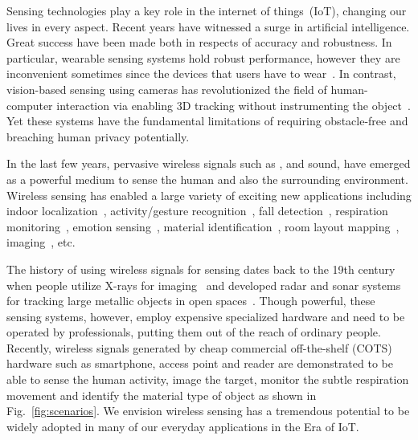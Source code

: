Sensing technologies play a key role in the internet of things~(IoT), changing our lives in every aspect. Recent years have witnessed a surge in artificial intelligence. Great success have been made both in respects of accuracy and robustness. In particular, wearable sensing systems hold robust performance, however they are inconvenient sometimes since the devices that users have to wear~\cite{Pinpoint}. In contrast, vision-based sensing using cameras has revolutionized the field of human-computer interaction via enabling 3D tracking without instrumenting the object~\cite{Cruz2015Quantification}. Yet these systems have the fundamental limitations of requiring obstacle-free and breaching human privacy potentially.

In the last few years, pervasive wireless signals such as \WiFi, \RFID and sound, have emerged as a powerful medium to sense the human and also the surrounding environment. Wireless sensing has enabled a large variety of exciting new applications including indoor localization~\cite{Arraytrack,
Tagoram}, activity/gesture recognition~\cite{Wang2015Understanding, wang2016human}, fall detection~\cite{wang2017wifall}, respiration monitoring~\cite{Smart-homes}, emotion sensing~\cite{Zhao2017Emotion},  material identification~\cite{Tagscan, LiquID}, room layout mapping~\cite{Lu2018}, imaging~\cite{zhao2018rf}, etc.


The history of using wireless signals for sensing dates back to the 19th century when people utilize X-rays for imaging~\cite{Suzuki1996} and developed radar and sonar systems for tracking large metallic objects in open
spaces~\cite{Au1988Sonar}. Though powerful, these sensing systems, however, employ expensive specialized hardware and need to be operated by professionals, putting them out of the reach of ordinary people.
Recently, wireless signals generated by cheap commercial off-the-shelf (COTS) hardware such as smartphone, \WiFi access point and \RFID reader are demonstrated to be able to
sense the human activity, image the target, monitor the subtle respiration movement and identify the material type of object as shown in Fig.~\ref{fig:scenarios}.  %
We envision wireless sensing has a tremendous potential to be widely adopted in many of our everyday applications in the Era of IoT. %


